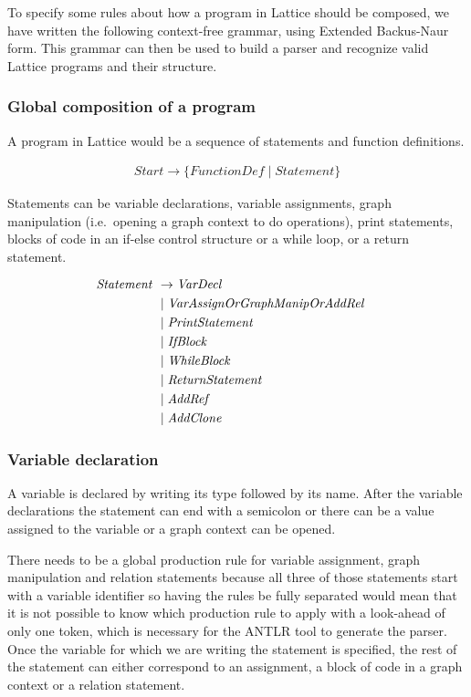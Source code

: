 To specify some rules about how a program in Lattice should be composed, we have written the following context-free grammar, using Extended Backus-Naur form.
This grammar can then be used to build a parser and recognize valid Lattice programs and their structure.

\subsubsection*{Global composition of a program}

A program in Lattice would be a sequence of statements and function definitions.

\begin{align*}
    \mathit{Start} \rightarrow \{ \mathit{FunctionDef} \mid \mathit{Statement} \}
\end{align*}

Statements can be variable declarations, variable assignments, graph manipulation (i.e.\ opening a graph context to do operations), print statements, blocks of code in an if-else control structure or a while loop, or a return statement.

\begin{align*}
    \omit $\mathit{Statement}$ \hfil& \rightarrow \mathit{VarDecl} \\
    & \mid \mathit{VarAssignOrGraphManipOrAddRel} \\
    & \mid \mathit{PrintStatement} \\
    & \mid \mathit{IfBlock} \\
    & \mid \mathit{WhileBlock} \\
    & \mid \mathit{ReturnStatement} \\
    & \mid \mathit{AddRef} \\
    & \mid \mathit{AddClone}
\end{align*}

\subsubsection*{Variable declaration}

A variable is declared by writing its type followed by its name.
After the variable declarations the statement can end with a semicolon or there can be a value assigned to the variable or a graph context can be opened.

There needs to be a global production rule for variable assignment, graph manipulation and relation statements because all three of those statements start with a variable identifier so having the rules be fully separated would mean that it is not possible to know which production rule to apply with a look-ahead of only one token, which is necessary for the ANTLR tool to generate the parser.
Once the variable for which we are writing the statement is specified, the rest of the statement can either correspond to an assignment, a block of code in a graph context or a relation statement.

